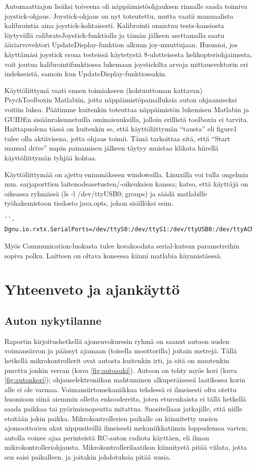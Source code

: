 \documentclass{article}
\begin{document}
Automaattiajon lisäksi toiveena oli näppäimistöohjauksen rinnalle saada toimiva joystick-ohjaus. Joystick-ohjaus on nyt toteutettu, mutta vaatii manuaalista kalibrointia aina joystick-kohtaisesti. Kalibrointi onnistuu tests-kansiosta löytyvällä calibrateJoystick-funktiolla ja tämän jälkeen asettamalla saatu ääriarvovektori UpdateDisplay-funktion alkuun joy-muuttujaan. Huomioi, jos käyttämäsi joystick eroaa testeissä käytetystä 8-ulotteisesta helikopteriohjaimesta, voit joutua kalibrointifunktiossa lukemaan joystickilta arvoja mittausvektorin eri indekseistä, samoin kun UpdateDisplay-funktiossakin.

Käyttöliittymä vaati ennen toimiakseen (kohtuuttoman kattavan) PsychToolboxin Matlabiin, jotta näppäimistöpainalluksia auton ohjaamiseksi voitiin lukea. Päätimme kuitenkin toteuttaa näppäimistön lukemisen Matlabin ja GUIDEn sisäänrakennetuilla ominaisuuksilla, jolloin erillistä toolboxia ei tarvita. Haittapuolena tässä on kuitenkin se, että käyttöliittymän ``tausta'' eli figure1 tulee olla aktiivisena, jotta ohjaus toimii. Tämä tarkoittaa sitä, että ``Start manual drive'' napin painamisen jälkeen täytyy muistaa klikata hiirellä käyttöliittymän tyhjää kohtaa.

Käyttöliittymää on ajettu enimmäkseen windowsilla. Linuxilla voi tulla ongelmia mm. sarjaporttien laitenodeasetusten/-oikeuksien kanssa; katso, että käyttäjä on oikeassa ryhmässä (ls -l /dev/ttyUSB0; groups) ja säädä matlabille työhakemistoon tiedosto java.opts, johon sisällöksi esim.
\begin{verbatim}
``-Dgnu.io.rxtx.SerialPorts=/dev/ttyS0:/dev/ttyS1:/dev/ttyUSB0:/dev/ttyACM0''.
\end{verbatim}
Myös Communication-luokasta tulee kovakoodata serial-kutsun parametreihin sopiva polku. Laitteen on oltava koneessa kiinni matlabia käynnistäessä.

\section{Yhteenveto ja ajankäyttö}

\subsection{Auton nykytilanne}
Raportin kirjoitushetkellä ajoneuvokurssin ryhmä on saanut autoon uuden voimansiirron ja päässyt ajamaan (toisella moottorilla) joitain metrejä. Tällä hetkellä mikrokontrollerit ovat autosta kuitenkin irti, ja sitä on muutenkin purettu jonkin verran (kuva \ref{fig:autoauki}). Autoon on tehty myös kori (kuva \ref{fig:autonkori}); ohjauselektroniikan mahtuminen alkuperäisessä laatikossa korin alle ei ole varmaa. Voimansiirtomekaniikkaa tehdessä ei ilmeisesti oltu otettu huomioon siinä aiemmin olleita enkoodereita, joten eturenkaista ei tällä hetkellä saada paikkaa tai pyörimisnopeutta mitattua. Suositellaan jatkajille, että niille etsitään jokin paikka. Mikrokontrollerien paikalle on kiinnitetty uusien ajomoottorien akut nippusiteillä ilmeisesti mekaniikkatiimin loppudemoa varten; autolla voinee ajaa perinteistä RC-auton radiota käyttäen, eli ilman mikrokontrolleriohjausta. Mikrokontrollerilaatikon kiinnitystä pitää viilata, jotta sen saisi paikalleen, ja joitakin johdotuksia pitää uusia.
\end{document}
